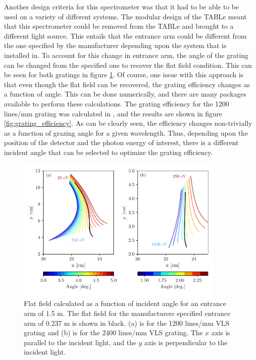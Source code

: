 Another design criteria for this spectrometer was that it had to be able to be used on a variety of different systems.  The modular design of the TABLe meant that this spectrometer could be removed from the TABLe and brought to a different light source.  This entails that the entrance arm could be different from the one specified by the manufacturer depending upon the system that is installed in.  To account for this change in entrance arm, the angle of the grating can be changed from the specified one to recover the flat field condition.  This can be seen for both gratings in figure \ref{fig:variable_flat_field}.  Of course, one issue with this approach is that even though the flat field can be recovered, the grating efficiency changes as a function of angle.  This can be done numerically, and there are many packages available to perform these calculations. The grating efficiency for the 1200 lines/mm grating was calculated in \cite{hageDevelopmentXUVSpectrometer}, and the results are shown in figure \ref{fig:grating_efficiency}.  As can be clearly seen, the efficiency changes non-trivially as a function of grazing angle for a given wavelength.  Thus, depending upon the position of the detector and the photon energy of interest, there is a different incident angle that can be selected to optimize the grating efficiency.
\begin{figure}
	\centering
	\includegraphics[width=0.9\textwidth]{figures/Beamline/variable_flat_field.pdf}
	\caption[Flat field of both VLS gratings as a function of input angle]{Flat field calculated as a function of incident angle for an entrance arm of 1.5 m.  The flat field for the manufacturers specified entrance arm of 0.237 m is shown in black. (a) is for the 1200 lines/mm VLS grating and (b) is for the 2400 lines/mm VLS grating. The $x$ axis is parallel to the incident light, and the $y$ axis is perpendicular to the incident light.}
	\label{fig:variable_flat_field}
\end{figure}

